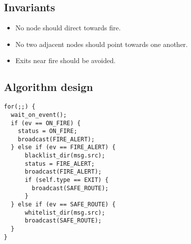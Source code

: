 \subsection{Invariants}
\begin{itemize}
  \item No node should direct towards fire.
  \item No two adjacent nodes should point towards one another.
  \item Exits near fire should be avoided.
\end{itemize}

\subsection{Algorithm design}
\begin{verbatim}
for(;;) {
  wait_on_event();
  if (ev == ON_FIRE) {
    status = ON_FIRE;
    broadcast(FIRE_ALERT);
  } else if (ev == FIRE_ALERT) {
      blacklist_dir(msg.src);
      status = FIRE_ALERT;
      broadcast(FIRE_ALERT);
      if (self.type == EXIT) {
        broadcast(SAFE_ROUTE);
      }
  } else if (ev == SAFE_ROUTE) {
      whitelist_dir(msg.src);
      broadcast(SAFE_ROUTE);
  }
}
\end{verbatim}
